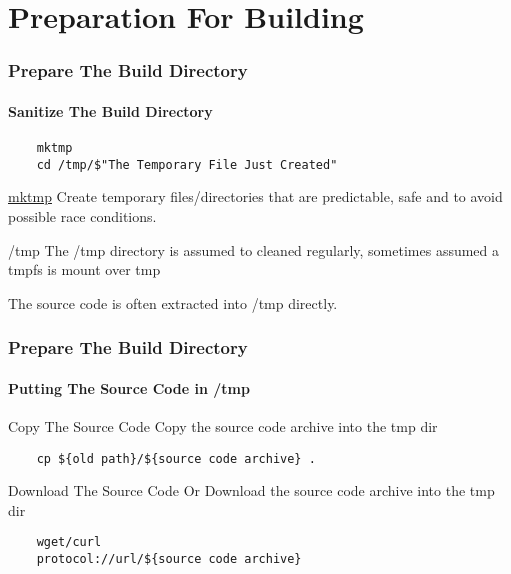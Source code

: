\documentclass[12pt,hyperref={pdfpagelabels=true}]{beamer}
\begin{document}
\section{Preparation For Building}

\begin{frame}[fragile]
  \frametitle{Prepare The Build Directory}
  \framesubtitle{Sanitize The Build Directory}
  \lstset{language=sh}
  \begin{lstlisting}
    mktmp
    cd /tmp/$"The Temporary File Just Created"
  \end{lstlisting}
  
  \pause
  
  \begin{alertblock}{\href{http://unixhelp.ed.ac.uk/CGI/man-cgi?mktemp}{mktmp}}
    Create temporary files/directories that are predictable, safe and to avoid
    possible race conditions.
  \end{alertblock}
  
  \pause

  \begin{alertblock}{/tmp}
    The /tmp directory is assumed to cleaned regularly, sometimes assumed a
    tmpfs is mount over tmp
    
    The source code is often extracted into /tmp directly.
  \end{alertblock}
\end{frame}

\begin{frame}[fragile]
  \frametitle{Prepare The Build Directory}
  \framesubtitle{Putting The Source Code in /tmp}
  \lstset{language=sh}
  \begin{block}{Copy The Source Code}
    Copy the source code archive into the tmp dir
  \end{block}
  
  \pause
  
  \begin{lstlisting}
    cp ${old path}/${source code archive} .
  \end{lstlisting}
  
  \pause
  
  \begin{block}{Download The Source Code}
    Or Download the source code archive into the tmp dir
  \end{block}
  
  \pause
  
  \begin{lstlisting}
    wget/curl
    protocol://url/${source code archive}
  \end{lstlisting}
\end{frame}
\end{document}
